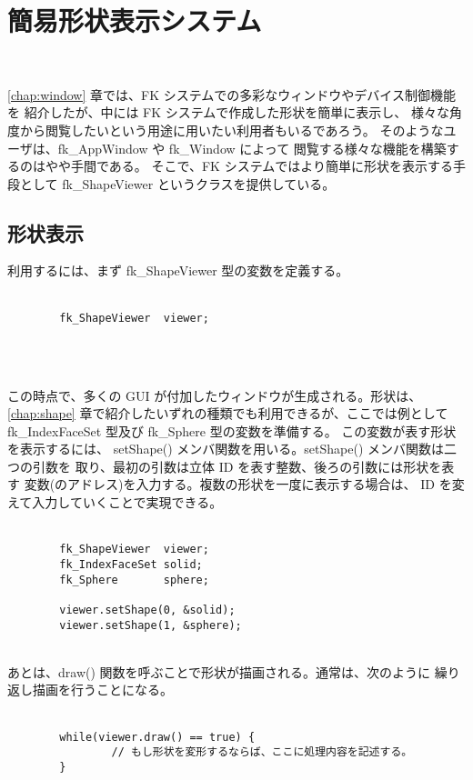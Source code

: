 \chapter{簡易形状表示システム} \label{chap:viewer} ~

\ref{chap:window} 章では、FK システムでの多彩なウィンドウやデバイス制御機能を
紹介したが、中には FK システムで作成した形状を簡単に表示し、
様々な角度から閲覧したいという用途に用いたい利用者もいるであろう。
そのようなユーザは、fk\_AppWindow や fk\_Window によって
閲覧する様々な機能を構築するのはやや手間である。
そこで、FK システムではより簡単に形状を表示する手段として
fk\_ShapeViewer というクラスを提供している。

\section{形状表示}
利用するには、まず fk\_ShapeViewer 型の変数を定義する。\\ ~ \\
\begin{screen}
\begin{verbatim}
        fk_ShapeViewer  viewer;
\end{verbatim}
\end{screen}
\\ ~

この時点で、多くの GUI が付加したウィンドウが生成される。形状は、
\ref{chap:shape} 章で紹介したいずれの種類でも利用できるが、ここでは例として
fk\_IndexFaceSet 型及び fk\_Sphere 型の変数を準備する。
この変数が表す形状を表示するには、
setShape() メンバ関数を用いる。setShape() メンバ関数は二つの引数を
取り、最初の引数は立体 ID を表す整数、後ろの引数には形状を表す
変数(のアドレス)を入力する。複数の形状を一度に表示する場合は、
ID を変えて入力していくことで実現できる。\\ ~ \\
\begin{breakbox}
\begin{verbatim}
        fk_ShapeViewer  viewer;
        fk_IndexFaceSet solid;
        fk_Sphere       sphere;

        viewer.setShape(0, &solid);
        viewer.setShape(1, &sphere);
\end{verbatim}
\end{breakbox}
~ \\

あとは、draw() 関数を呼ぶことで形状が描画される。通常は、次のように
繰り返し描画を行うことになる。\\ ~ \\
\begin{breakbox}
\begin{verbatim}
        while(viewer.draw() == true) {
                // もし形状を変形するならば、ここに処理内容を記述する。
        }
\end{verbatim}
\end{breakbox}
~ \\

